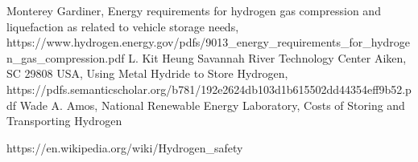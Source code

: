 \begin{thebibliography}{9}
Monterey Gardiner, Energy requirements for hydrogen gas compression and liquefaction as related to vehicle storage needs, https://www.hydrogen.energy.gov/pdfs/9013\_energy\_requirements\_for\_hydrogen\_gas\_compression.pdf
L. Kit Heung Savannah River Technology Center Aiken, SC 29808 USA, Using Metal Hydride to Store Hydrogen, https://pdfs.semanticscholar.org/b781/192e2624db103d1b615502dd44354eff9b52.pdf
Wade A. Amos, National Renewable Energy Laboratory, Costs of Storing and Transporting Hydrogen


https://en.wikipedia.org/wiki/Hydrogen\_safety



\end{thebibliography}










%







